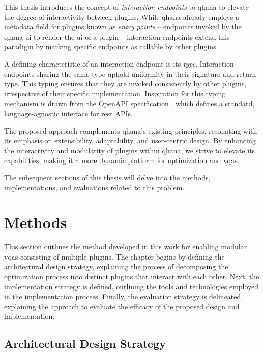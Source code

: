\documentclass[
  a4paper,  %
  twoside,  %
  bibliography=totoc,
  headsepline,
  cleardoublepage=empty,
  parskip=half,
  draft=false
]{scrbook}
\begin{document}
This thesis introduces the concept of \emph{interaction endpoints} to \gls{qhana} to elevate the degree of interactivity between plugins.
While \gls{qhana} already employs a metadata field for plugins known as \emph{entry points} -- endpoints invoked by the \gls{qhana} \gls{ui} to render the \gls{ui} of a plugin -- interaction endpoints extend this paradigm by marking specific endpoints as callable by other plugins.

A defining characteristic of an interaction endpoint is its \emph{type}.
Interaction endpoints sharing the same type uphold uniformity in their signature and return type.
This typing ensures that they are invoked consistently by other plugins, irrespective of their specific implementation.
Inspiration for this typing mechanism is drawn from the OpenAPI specification \cite{Miller}, which defines a standard, language-agnostic interface for \gls{rest} APIs.

The proposed approach complements \gls{qhana}'s existing principles, resonating with its emphasis on extensibility, adaptability, and user-centric design.
By enhancing the interactivity and modularity of plugins within \gls{qhana}, we strive to elevate its capabilities, making it a more dynamic platform for optimization and \glspl{vqa}.

The subsequent sections of this thesis will delve into the methods, implementations, and evaluations related to this problem.


\chapter{Methods}
\label{chap:methodology}
This section outlines the method developed in this work for enabling modular \glspl{vqa} consisting of multiple plugins.
The chapter begins by defining the architectural design strategy, explaining the process of decomposing the optimization process into distinct plugins that interact with each other.
Next, the implementation strategy is defined, outlining the tools and technologies employed in the implementation process.
Finally, the evaluation strategy is delineated, explaining the approach to evaluate the efficacy of the proposed design and implementation.

\section{Architectural Design Strategy}
\label{sec:architecturalDesignStrategy}
\end{document}
